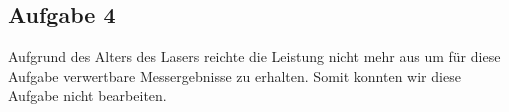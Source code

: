 \subsection{Aufgabe 4}

Aufgrund des Alters des Lasers reichte die Leistung nicht mehr aus um für diese Aufgabe verwertbare Messergebnisse zu erhalten. Somit konnten wir diese Aufgabe nicht bearbeiten.